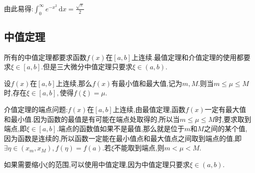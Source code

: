 由此易得:$\displaystyle \int_{0}^{\infty} e^{-x^2} \,\mathrm{d}x =\frac{\sqrt{\pi}}{2}$

\subsection{中值定理}
所有的中值定理都要求函数$f(x)$在$[a,b]$上连续.最值定理和介值定理的使用都要求$\xi \in [a,b].$但是三大微分中值定理只要求$\xi \in (a,b).$
\begin{theorem}[最值和介值定理]
    设$f(x)$在$[a,b]$上连续,那么$f(x)$有最小值和最大值,记为$m,M$.则当$m\leqslant \mu \leqslant M$时,存在$\xi \in [a,b],$使得$f(\xi)=\mu.$
\end{theorem}
介值定理的端点问题:$f(x)$在$[a,b]$上连续,由最值定理,函数$f(x)$一定有最大值和最小值.因为函数的最值是有可能在端点处取得的,所以当$m\leqslant \mu \leqslant M$时,要求取到端点,即$\xi \in [a,b].$端点的函数值如果不是最值,那么就是位于$m$和$M$之间的某个值,因为函数是连续的,所以函数一定能在最小值点和最大值点之间取到端点的值,即$\exists \eta \in (x_m,x_M),f(\eta)=f(a)$.若$\xi$不能取到端点,则$m< \mu < M.$

如果需要缩小$\xi$的范围,可以使用中值定理,因为中值定理只要求$\xi \in (a,b).$

